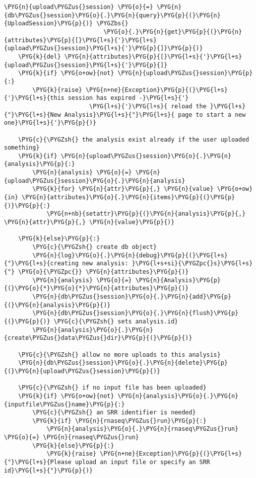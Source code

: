 \begin{Verbatim}[commandchars=\\\{\}]
    \PYG{n}{upload\PYGZus{}session} \PYG{o}{=} \PYG{n}{db\PYGZus{}session}\PYG{o}{.}\PYG{n}{query}\PYG{p}{(}\PYG{n}{UploadSession}\PYG{p}{)} \PYGZbs{}
                            \PYG{o}{.}\PYG{n}{get}\PYG{p}{(}\PYG{n}{attributes}\PYG{p}{[}\PYG{l+s}{'}\PYG{l+s}{upload\PYGZus{}session}\PYG{l+s}{'}\PYG{p}{]}\PYG{p}{)}
    \PYG{k}{del} \PYG{n}{attributes}\PYG{p}{[}\PYG{l+s}{'}\PYG{l+s}{upload\PYGZus{}session}\PYG{l+s}{'}\PYG{p}{]}
    \PYG{k}{if} \PYG{o+ow}{not} \PYG{n}{upload\PYGZus{}session}\PYG{p}{:}
        \PYG{k}{raise} \PYG{n+ne}{Exception}\PYG{p}{(}\PYG{l+s}{'}\PYG{l+s}{this session has expired -}\PYG{l+s}{'}
                        \PYG{l+s}{'}\PYG{l+s}{ reload the }\PYG{l+s}{"}\PYG{l+s}{New Analysis}\PYG{l+s}{"}\PYG{l+s}{ page to start a new one}\PYG{l+s}{'}\PYG{p}{)}

    \PYG{c}{\PYGZsh{} the analysis exist already if the user uploaded something}
    \PYG{k}{if} \PYG{n}{upload\PYGZus{}session}\PYG{o}{.}\PYG{n}{analysis}\PYG{p}{:}
        \PYG{n}{analysis} \PYG{o}{=} \PYG{n}{upload\PYGZus{}session}\PYG{o}{.}\PYG{n}{analysis}
        \PYG{k}{for} \PYG{n}{attr}\PYG{p}{,} \PYG{n}{value} \PYG{o+ow}{in} \PYG{n}{attributes}\PYG{o}{.}\PYG{n}{items}\PYG{p}{(}\PYG{p}{)}\PYG{p}{:}
            \PYG{n+nb}{setattr}\PYG{p}{(}\PYG{n}{analysis}\PYG{p}{,} \PYG{n}{attr}\PYG{p}{,} \PYG{n}{value}\PYG{p}{)}

    \PYG{k}{else}\PYG{p}{:}
        \PYG{c}{\PYGZsh{} create db object}
        \PYG{n}{log}\PYG{o}{.}\PYG{n}{debug}\PYG{p}{(}\PYG{l+s}{"}\PYG{l+s}{creating new analysis: }\PYG{l+s+si}{\PYGZpc{}s}\PYG{l+s}{"} \PYG{o}{\PYGZpc{}} \PYG{n}{attributes}\PYG{p}{)}
        \PYG{n}{analysis} \PYG{o}{=} \PYG{n}{Analysis}\PYG{p}{(}\PYG{o}{*}\PYG{o}{*}\PYG{n}{attributes}\PYG{p}{)}
        \PYG{n}{db\PYGZus{}session}\PYG{o}{.}\PYG{n}{add}\PYG{p}{(}\PYG{n}{analysis}\PYG{p}{)}
        \PYG{n}{db\PYGZus{}session}\PYG{o}{.}\PYG{n}{flush}\PYG{p}{(}\PYG{p}{)} \PYG{c}{\PYGZsh{} sets analysis.id}
        \PYG{n}{analysis}\PYG{o}{.}\PYG{n}{create\PYGZus{}data\PYGZus{}dir}\PYG{p}{(}\PYG{p}{)}

    \PYG{c}{\PYGZsh{} allow no more uploads to this analysis}
    \PYG{n}{db\PYGZus{}session}\PYG{o}{.}\PYG{n}{delete}\PYG{p}{(}\PYG{n}{upload\PYGZus{}session}\PYG{p}{)}

    \PYG{c}{\PYGZsh{} if no input file has been uploaded}
    \PYG{k}{if} \PYG{o+ow}{not} \PYG{n}{analysis}\PYG{o}{.}\PYG{n}{inputfile\PYGZus{}name}\PYG{p}{:}
        \PYG{c}{\PYGZsh{} an SRR identifier is needed}
        \PYG{k}{if} \PYG{n}{rnaseq\PYGZus{}run}\PYG{p}{:}
            \PYG{n}{analysis}\PYG{o}{.}\PYG{n}{rnaseq\PYGZus{}run} \PYG{o}{=} \PYG{n}{rnaseq\PYGZus{}run}
        \PYG{k}{else}\PYG{p}{:}
            \PYG{k}{raise} \PYG{n+ne}{Exception}\PYG{p}{(}\PYG{l+s}{"}\PYG{l+s}{Please upload an input file or specify an SRR id}\PYG{l+s}{"}\PYG{p}{)}


\end{Verbatim}
